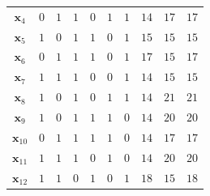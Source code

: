 \begin{table}[!htbp]
\begin{tabular}{cccccccccc}
		$\textbf{x}_{4}$	&	$0$	&	$1$	&	$1$	&	$0$	&	$1$	&	$1$	&	$14$	&	$17$	&	$17$	\\
		$\textbf{x}_{5}$	&	$1$	&	$0$	&	$1$	&	$1$	&	$0$	&	$1$	&	$15$	&	$15$	&	$15$	\\
		$\textbf{x}_{6}$	&	$0$	&	$1$	&	$1$	&	$1$	&	$0$	&	$1$	&	$17$	&	$15$	&	$17$	\\
		$\textbf{x}_{7}$	&	$1$	&	$1$	&	$1$	&	$0$	&	$0$	&	$1$	&	$14$	&	$15$	&	$15$	\\
		$\textbf{x}_{8}$	&	$1$	&	$0$	&	$1$	&	$0$	&	$1$	&	$1$	&	$14$	&	$21$	&	$21$	\\
		$\textbf{x}_{9}$	&	$1$	&	$0$	&	$1$	&	$1$	&	$1$	&	$0$	&	$14$	&	$20$	&	$20$	\\
		$\textbf{x}_{10}$	&	$0$	&	$1$	&	$1$	&	$1$	&	$1$	&	$0$	&	$14$	&	$17$	&	$17$	\\
		$\textbf{x}_{11}$	&	$1$	&	$1$	&	$1$	&	$0$	&	$1$	&	$0$	&	$14$	&	$20$	&	$20$	\\
		$\textbf{x}_{12}$	&	$1$	&	$1$	&	$0$	&	$1$	&	$0$	&	$1$	&	$18$	&	$15$	&	$18$	\\
		\hline
	\end{tabular}
\end{table}

